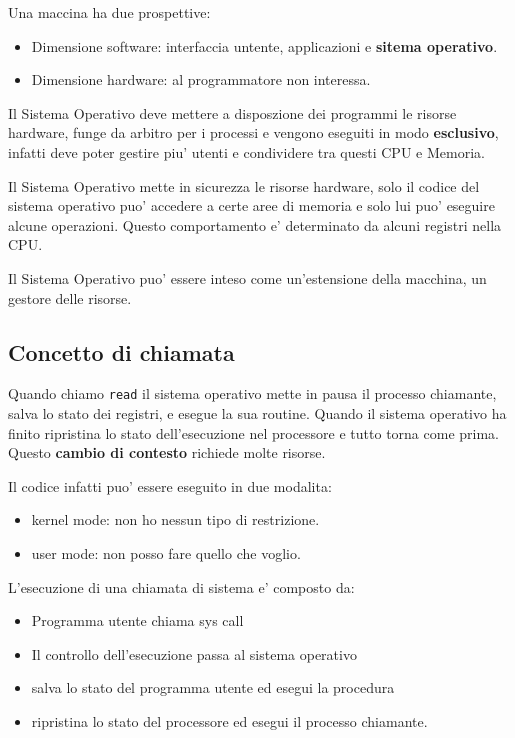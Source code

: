 Una maccina ha due prospettive:
\begin{itemize}
    \item Dimensione software: interfaccia untente, applicazioni e \textbf{sitema operativo}. 
    \item Dimensione hardware: al programmatore non interessa.
\end{itemize}

Il Sistema Operativo deve mettere a disposzione dei programmi le risorse hardware,
funge da arbitro per i processi e vengono eseguiti in modo \textbf{esclusivo}, infatti deve
poter gestire piu' utenti e condividere tra questi CPU e Memoria.

Il Sistema Operativo mette in sicurezza le risorse hardware, solo il codice del 
sistema operativo puo' accedere a certe aree di memoria e solo lui puo' eseguire alcune
operazioni. Questo comportamento e' determinato da alcuni registri nella CPU.

Il Sistema Operativo puo' essere inteso come un'estensione della macchina, un gestore delle risorse.

\subsection{Concetto di chiamata}
Quando chiamo \texttt{read} il sistema operativo mette in pausa il processo chiamante,
salva lo stato dei registri, e esegue la sua routine. Quando il sistema operativo ha finito
ripristina lo stato dell'esecuzione nel processore e tutto torna come prima.
Questo \textbf{cambio di contesto} richiede molte risorse.

Il codice infatti puo' essere eseguito in due modalita:
\begin{itemize}
    \item kernel mode: non ho nessun tipo di restrizione.
    \item user mode: non posso fare quello che voglio.
\end{itemize}

L'esecuzione di una chiamata di sistema e' composto da:
\begin{itemize}
    \item Programma utente chiama sys call
    \item Il controllo dell'esecuzione passa al sistema operativo
    \item salva lo stato del programma utente ed esegui la procedura
    \item ripristina lo stato del processore ed esegui il processo chiamante.
\end{itemize}

